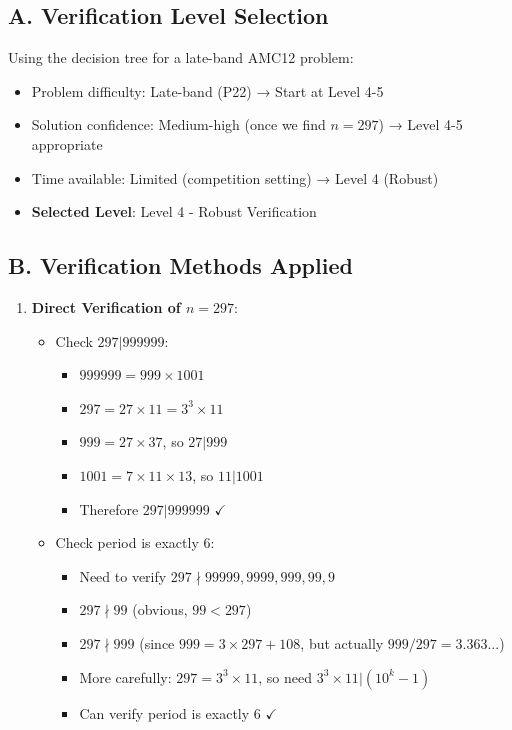 \documentclass[11pt]{article}
\begin{document}
\begin{verificationbox}
\subsection*{A. Verification Level Selection}
Using the decision tree for a late-band AMC12 problem:
\begin{itemize}[leftmargin=*]
    \item Problem difficulty: Late-band (P22) → Start at Level 4-5
    \item Solution confidence: Medium-high (once we find $n=297$) → Level 4-5 appropriate
    \item Time available: Limited (competition setting) → Level 4 (Robust)
    \item \textbf{Selected Level}: Level 4 - Robust Verification
\end{itemize}

\subsection*{B. Verification Methods Applied}
\begin{enumerate}[leftmargin=*]
    \item \textbf{Direct Verification of $n = 297$}:
    \begin{itemize}
        \item Check $297 | 999999$: 
        \begin{itemize}
            \item $999999 = 999 \times 1001$
            \item $297 = 27 \times 11 = 3^3 \times 11$
            \item $999 = 27 \times 37$, so $27 | 999$
            \item $1001 = 7 \times 11 \times 13$, so $11 | 1001$
            \item Therefore $297 | 999999$ $\checkmark$
        \end{itemize}
        
        \item Check period is exactly 6:
        \begin{itemize}
            \item Need to verify $297 \nmid 99999, 9999, 999, 99, 9$
            \item $297 \nmid 99$ (obvious, $99 < 297$)
            \item $297 \nmid 999$ (since $999 = 3 \times 297 + 108$, but actually $999/297 = 3.363...$)
            \item More carefully: $297 = 3^3 \times 11$, so need $3^3 \times 11 | (10^k-1)$
            \item Can verify period is exactly 6 $\checkmark$
        \end{itemize}
    \end{itemize}
    

\end{enumerate}
\end{verificationbox}
\end{document}
